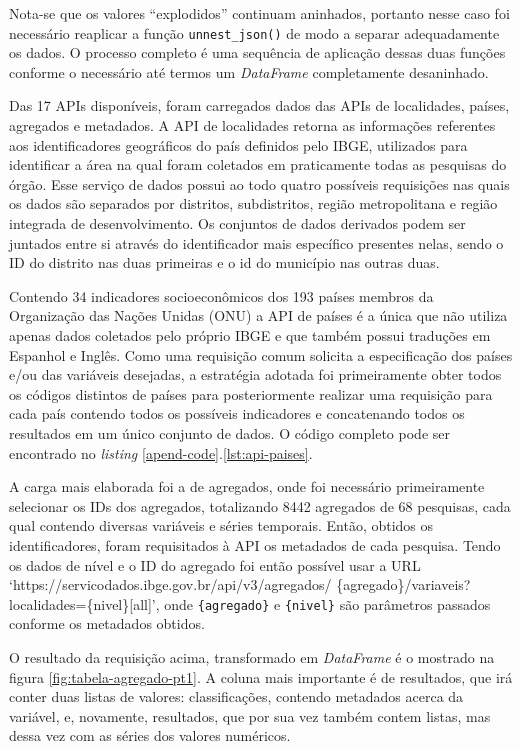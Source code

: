     Nota-se que os valores ``explodidos'' continuam aninhados, portanto nesse caso foi necessário reaplicar a função \lstinline{unnest_json()} de modo a separar adequadamente os dados. O processo completo é uma sequência de aplicação dessas duas funções conforme o necessário até termos um \textit{DataFrame} completamente desaninhado.

    Das 17 APIs disponíveis, foram carregados dados das APIs de localidades, países, agregados e metadados. A API de localidades retorna as informações referentes aos identificadores geográficos do país definidos pelo IBGE, utilizados para identificar a área na qual foram coletados em praticamente todas as pesquisas do órgão. Esse serviço de dados possui ao todo quatro possíveis requisições nas quais os dados são separados por distritos, subdistritos, região metropolitana e região integrada de desenvolvimento. Os conjuntos de dados derivados podem ser juntados entre si através do identificador mais específico presentes nelas, sendo o ID do distrito nas duas primeiras e o id do município nas outras duas.

    Contendo 34 indicadores socioeconômicos dos 193 países membros da Organização das Nações Unidas (ONU) a API de países é a única que não utiliza apenas dados coletados pelo próprio IBGE e que também possui traduções em Espanhol e Inglês. Como uma requisição comum solicita a especificação dos países e/ou das variáveis desejadas, a estratégia adotada foi primeiramente obter todos os códigos distintos de países para posteriormente realizar uma requisição para cada país contendo todos os possíveis indicadores e concatenando todos os resultados em um único conjunto de dados. O código completo pode ser encontrado no \textit{listing} \ref{apend-code}.\ref{lst:api-paises}.

    A carga mais elaborada foi a de agregados, onde foi necessário primeiramente selecionar os IDs dos agregados, totalizando 8442 agregados de 68 pesquisas, cada qual contendo diversas variáveis e séries temporais. Então, obtidos os identificadores, foram requisitados à API os metadados de cada pesquisa. Tendo os dados de nível e o ID do agregado foi então possível usar a URL `https://servicodados.ibge.gov.br/api/v3/agregados/
    \{agregado\}/variaveis?localidades=\{nivel\}[all]', onde \verb|{agregado}| e \verb|{nivel}| são parâmetros passados conforme os metadados obtidos. 
    
    O resultado da requisição acima, transformado em \textit{DataFrame} é o mostrado na figura \ref{fig:tabela-agregado-pt1}. A coluna mais importante é de resultados, que irá conter duas listas de valores: classificações, contendo metadados acerca da variável, e, novamente, resultados, que por sua vez também contem listas, mas dessa vez com as séries dos valores numéricos. 
    
